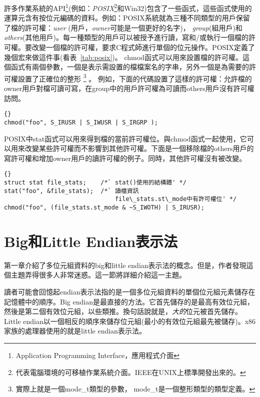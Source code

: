 許多作業系統的API\footnote{Application Programming
Interface，應用程式介面}(例如：\emph{POSIX}\footnote{代表電腦環境的可移植作業系統介面。IEEE在UNIX上標準開發出來的。}和Win32)包含了一些函式，這些函式使用的運算元含有按位元編碼的資料。例如：POSIX系統就為三種不同類型的用戶保留了檔的許可權：\emph{user}
(用戶，\emph{owner}可能是一個更好的名字)，
\emph{group}(組用戶)和\emph{others}(其他用戶)。每一種類型的用戶可以被授予進行讀，寫和/或執行一個檔的許可權。要改變一個檔的許可權，要求C程式師進行單個的位元操作。POSIX定義了幾個宏來做這件事(看表~\ref{tab:posix})。{\code
chmod}函式可以用來設置檔的許可權。這個函式有兩個參數，一個是表示需設置的檔檔案名的字串，另外一個是為需要的許可權設置了正確位的整形
\footnote{實際上就是一個{\code mode\_t}類型的參數，{\code
mode\_t}是一個整形類型的類型定義。} 。
例如，下面的代碼設置了這樣的許可權：允許檔的owner用戶對檔可讀可寫，在group中的用戶許可權為可讀而others用戶沒有許可權訪問。
\begin{lstlisting}[stepnumber=0]{}
chmod("foo", S_IRUSR | S_IWUSR | S_IRGRP );
\end{lstlisting}

POSIX中{\code stat}函式可以用來得到檔的當前許可權位。與{\code chmod}函式一起使用，它可以用來改變某些許可權而不影響到其他許可權。下面是一個移除檔的others用戶的寫許可權和增加owner用戶的讀許可權的例子。同時，其他許可權沒有被改變。
\lstset{escapeinside=`',language=Pascal,%
}
\begin{lstlisting}{}
struct stat file_stats;    /*` stat()使用的結構體' */
stat("foo", &file_stats);  /*` 讀檔資訊
                               file\_stats.st\_mode中有許可權位' */
chmod("foo", (file_stats.st_mode & ~S_IWOTH) | S_IRUSR);
\end{lstlisting}

\section{Big和Little Endian表示法}

第一章介紹了多位元組資料的big和little endian表示法的概念。但是，作者發現這個主題弄得很多人非常迷惑。這一節將詳細介紹這一主題。

讀者可能會回憶起endian表示法指的是一個多位元組資料的單個位元組元素儲存在記憶體中的順序。Big endian是最直接的方法。它首先儲存的是最高有效位元組，然後是第二個有效位元組，以些類推。換句話說就是，\emph{大的}位元被首先儲存。Little
endian以一個相反的順序來儲存位元組(最小的有效位元組最先被儲存)。x86家族的處理器使用的就是little endian表示法。

